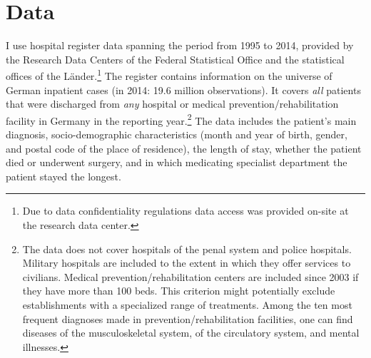 \documentclass[11pt, a4paper]{article} %
\begin{document}
\bigskip
\section{Data}\label{sec:data} 
I use hospital register data spanning the period from 1995 to 2014, provided by the Research Data Centers of the Federal Statistical Office and the statistical offices of the Länder.\footnote{Due to data confidentiality regulations data access was provided on-site at the research data center.} The register contains information on the universe of German inpatient cases (in 2014: 19.6 million observations). It covers \textit{all} patients that were discharged from \textit{any} hospital or medical prevention/rehabilitation facility in Germany in the reporting year.\footnote{The data does not cover hospitals of the penal system and police hospitals. Military hospitals are included to the extent in which they offer services to civilians. Medical prevention/rehabilitation centers are included since 2003 if they have more than 100 beds. This criterion might potentially exclude establishments with a specialized range of treatments. Among the ten most frequent diagnoses made in prevention/rehabilitation facilities, one can find diseases of the musculoskeletal system, of the circulatory system, and mental illnesses.} The data includes the patient's main diagnosis, socio-demographic characteristics (month and year of birth, gender, and postal code of the place of residence), the length of stay, whether the patient died or underwent surgery, and in which medicating specialist department the patient stayed the longest.\newline 
\end{document}
